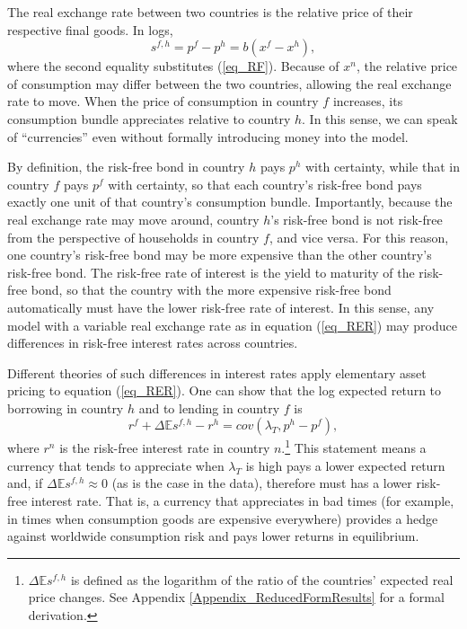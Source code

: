 \documentclass{ar-1col}
\begin{document}
The real exchange rate between two countries is the relative price of
their respective final goods. In logs,
\begin{equation}\label{eq_RER}
  s^{f,h}=p^{f}-p^{h}=b(x^{f}-x^{h}),
\end{equation}
where the second equality substitutes (\ref{eq_RF}).
Because of $x^{n}$, the relative price of consumption may differ between the two countries, allowing the real exchange rate to move. When the price of consumption in country $f$ increases, its consumption bundle appreciates relative to country $h$. In this sense, we can speak of ``currencies'' even without formally introducing money into the model. 

By definition, the risk-free bond in country $h$ pays $p^h$ with certainty, while that in country $f$ pays $p^f$ with certainty, so that each country's risk-free bond pays exactly one unit of that country's consumption bundle. Importantly, because the real exchange rate may move around, country $h$'s risk-free bond is not risk-free from the perspective of households in country $f$, and vice versa. For this reason, one country's risk-free bond may be more expensive than the other country's risk-free bond. The risk-free rate of interest is the yield to maturity of the risk-free bond, so that the country with the more expensive risk-free bond automatically must have the lower risk-free rate of interest. In this sense, any model with a variable real exchange rate as in equation (\ref{eq_RER}) may produce differences in risk-free interest rates across countries.

Different theories of such differences in interest rates apply
elementary asset pricing to equation (\ref{eq_RER}). One can show that the log expected return to
borrowing in country $h$ and to lending in country $f$ is
\begin{equation}
  r^{f} + \Delta \mathbb{E} s^{f,h} - r^{h} =cov\left( \lambda _{T},p^{h}-p^{f}\right),
  \label{eq_UIP_RF}
\end{equation}%
where $r^{n}$ is the risk-free interest rate in country $n$.\footnote{$\Delta\mathbb{E}s^{f,h}$ is defined as the
  logarithm of the ratio of the countries' expected real price
  changes. See Appendix \ref{Appendix_ReducedFormResults} for a formal
  derivation.} This statement means a currency that tends to
appreciate when $\lambda_T$ is high pays a lower expected return and,
if $\Delta \mathbb{E} s^{f,h}\approx0$ (as is the case in the data), therefore must has a lower risk-free interest
rate. That is, a currency that appreciates in bad times (for example, in times when
consumption goods are expensive everywhere) provides a
hedge against worldwide consumption risk and pays lower returns in
equilibrium.
\end{document}

